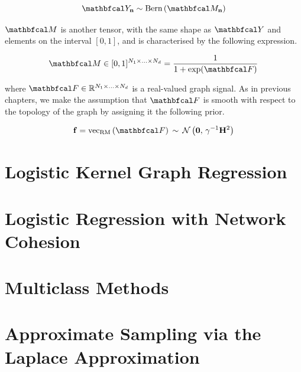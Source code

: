 \begin{equation*}
    \Yt_\nn \sim \text{Bern}\left(\Mt_\nn \right)
\end{equation*}


$\Mt$ is another tensor, with the same shape as $\Yt$ and elements on the interval $[0, 1]$, and is characterised by the following expression. 

\begin{equation}
    \Mt \in [0, 1]^{N_1 \times ... \times N_d}= \frac{1}{1 + \exp(\Ft)}
\end{equation}

where $\Ft \in \R^{N_1 \times ... \times N_d}$ is a real-valued graph signal. As in previous chapters, we make the assumption that $\Ft$ is smooth with respect to the topology of the graph by assigning it the following prior. 

\begin{equation}
    \f = \vecrm{\Ft} \, \sim \, \mathcal{N}\left( \zero, \, \gamma^{-1} \HH^2 \right) 
\end{equation}



\cite{Li2012}

\section{Logistic Kernel Graph Regression}

 
\label{sec:lkgr}


\section{Logistic Regression with Network Cohesion}

\label{sec:lrnc}

\section{Multiclass Methods}

\label{sec:multiclass}


\section{Approximate Sampling via the Laplace Approximation}

\label{sec:lsamp}

